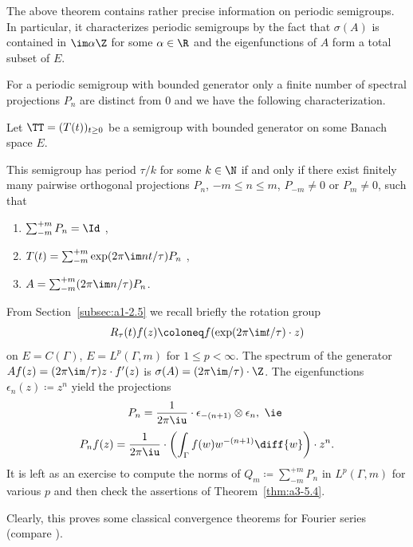 The above theorem contains rather precise information on periodic semigroups.
In particular, it characterizes periodic semigroups by the fact that $\sigma(A)$ is contained in $\im\alpha\Z$ for some $\alpha \in \R$ and the eigenfunctions of\/ $A$ form a total subset of\/ $E$.

For a periodic semigroup with bounded generator
only a finite number of spectral projections $P_{n}$ are distinct from $0$ and we have the following characterization.
\begin{corollary}\label{cor:a3-5.5}
Let $\TT = (T(t))_{t \geq 0}$ be a semigroup with bounded generator on some Banach space $E$.

This semigroup has period $\tau/k$ for some $k \in \N$ if and only if there exist finitely many pairwise orthogonal projections $P_{n}$, $-m \leq n \leq m$, $P_{-m} \neq 0$ or $P_{m} \neq 0$, such that
\begin{enumerate}[\upshape (i)]
\item 
$\sum_{-m}^{+m} P_{n} =  \Id$ ,

\item 
$T(t) = \sum_{-m}^{+m} \exp(2\pi\im nt/\tau)P_{n}$ ,

\item 
$A = \sum_{-m}^{+m} (2\pi\im n/\tau)P_{n}$. 

\end{enumerate}
\end{corollary}
\begin{example}\label{ex:a3-5.6} 
From Section~\ref{subsec:a1-2.5} we recall briefly the rotation group
\[
R_{\tau}(t)f(z) \coloneq f(\exp(2\pi\im t/\tau) \cdot z)
\]
on $E = C(\Gamma)$, \resp $E = L^{p}(\Gamma,m)$ for $1 \leq p < \infty$.
The spectrum of the generator\quad
$Af(z) = (2\pi\im /\tau)z \cdot f'(z)$\quad
is \quad $\sigma(A) = (2\pi\im /\tau) \cdot\Z$.
The eigenfunctions $\epsilon_{n}(z) \coloneq z^{n}$ yield the projections
\[
P_{n} = \frac{1}{2\pi \iu} \cdot\epsilon_{-(n+1)} \otimes \epsilon_{n}, \text{ \ie }
\]
\[
P_{n}f(z) = \frac{1}{2\pi \iu}  \cdot \left( \int_{\Gamma} f(w)w^{-(n+1)} \diff{w} \right)\cdot z^{n} .
\]
It is left as an exercise to compute the norms of\/ $Q_{m} \coloneq \sum_{-m}^{+m} P_{n}$ in $L^{p}(\Gamma,m)$ for various $p$ and then check the assertions of Theorem~\ref{thm:a3-5.4}.

Clearly, this proves some classical convergence theorems for Fourier series (compare \textcite[Chap.8.1]{davies:1980}).
\end{example}

